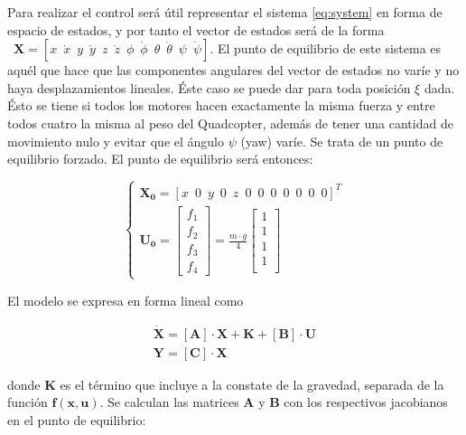 \documentclass[twoside,11pt]{book}
\begin{document}
Para realizar el control será útil representar el sistema \ref{eq:system} en forma de espacio de estados, y por tanto el vector de estados será de la forma $\enspace \pmb{X}=\left[ x \enspace \dot{x} \enspace y \enspace \dot{y} \enspace z \enspace \dot{z} \enspace \phi \enspace \dot{\phi} \enspace \theta \enspace \dot{\theta} \enspace \psi \enspace \dot{\psi} \right]$. El punto de equilibrio de este sistema es aquél que hace que las componentes angulares del vector de estados no varíe y no haya desplazamientos lineales. Éste caso se puede dar para toda posición $\xi$ dada. Ésto se tiene si todos los motores hacen exactamente la misma fuerza y entre todos cuatro la misma al peso del Quadcopter, además de tener una cantidad de movimiento nulo y evitar que el ángulo  $\psi$ (yaw) varíe. Se trata de un punto de equilibrio forzado. El punto de equilibrio será entonces:

\begin{equation}
\begin{cases}
\pmb{X_0}=\left[x \enspace 0 \enspace y \enspace 0 \enspace z \enspace 0 \enspace 0 \enspace 0 \enspace 0 \enspace 0 \enspace 0 \enspace 0 \right]^{T} \\
\pmb{U_0}=\left[ \begin{array}{l}
f_{1} \\
f_{2} \\
f_{3} \\
f_{4} \end{array} \right] = \frac{m \cdot g}{4} \left[ \begin{array}{l}
1 \\
1 \\
1 \\
1 \\ \end{array} \right]
\end{cases}
\end{equation}

El modelo se expresa en forma lineal como

\begin{equation}
\begin{array}{l}
\pmb{\dot{X}}=[\pmb{A}] \cdot \pmb{X} + \pmb{K} + [\pmb{B}] \cdot \pmb{U} \\
\pmb{Y} = [\pmb{C}] \cdot \pmb{X} 
\end{array}
\end{equation} 

donde $\pmb{K}$ es el término que incluye a la constate de la gravedad, separada de la función $\pmb{f(x,u)}$. Se calculan las matrices $\pmb{A}$ y $\pmb{B}$ con los respectivos jacobianos en el punto de equilibrio:
\end{document}
